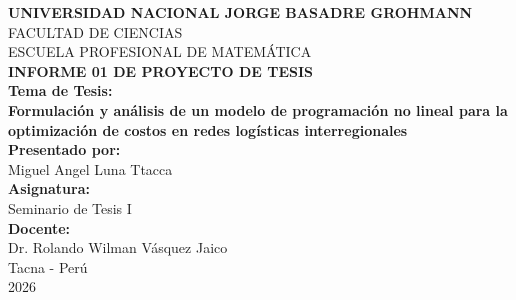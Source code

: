 \documentclass[12pt,a4paper]{article}
\begin{document}
\begin{titlepage}
    \centering
    
    {\Large \textbf{UNIVERSIDAD NACIONAL JORGE BASADRE GROHMANN}} \\[0.5cm]
    {\large FACULTAD DE CIENCIAS} \\[0.5cm] 
    {\large ESCUELA PROFESIONAL DE MATEMÁTICA} \\[2.5cm]
    
    {\Large \textbf{INFORME 01 DE PROYECTO DE TESIS}} \\[2cm]
    
    {\Large \textbf{Tema de Tesis:}} \\[0.5cm]
    {\large \textbf{Formulación y análisis de un modelo de programación no lineal para la optimización de costos en redes logísticas interregionales}} \\[3cm]
    
    {\large \textbf{Presentado por:}} \\[0.5cm]
    {\large Miguel Angel Luna Ttacca} \\[0.5cm]
    
    {\large \textbf{Asignatura:}} \\[0.5cm]
    {\large Seminario de Tesis I} \\[0.5cm]
    
    {\large \textbf{Docente:}} \\[0.5cm]
    {\large Dr. Rolando Wilman Vásquez Jaico} \\[1cm]
    
    {\large Tacna - Perú} \\[0.5cm]
    {\large 2026}
    
\end{titlepage}

\tableofcontents
\newpage










\end{document}
